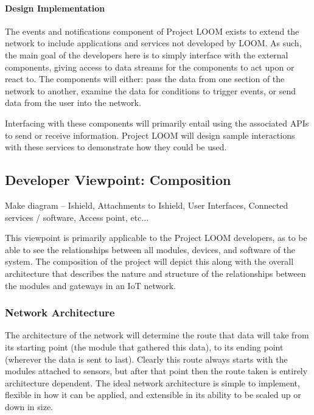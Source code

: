\documentclass[onecolumn, draftclsnofoot,10pt, compsoc]{IEEEtran}
\begin{document}
\paragraph{Design Implementation}
    The events and notifications component of Project LOOM exists to extend the network to include applications and services not developed by LOOM. As such, the main goal of the developers here is to simply interface with the external components, giving access to data streams for the components to act upon or react to. The components will either: pass the data from one section of the network to another, examine the data for conditions to trigger events, or send data from the user into the network.

    Interfacing with these components will primarily entail using the associated APIs to send or receive information. Project LOOM will design sample interactions with these services to demonstrate how they could be used.






\subsection{Developer Viewpoint: Composition}
    Make diagram – Ishield, Attachments to Ishield, User Interfaces, Connected services / software, Access point, etc...

    This viewpoint is primarily applicable to the Project LOOM developers, as to be able to see the relationships between all modules, devices, and software of the system. The composition of the project will depict this along with the overall architecture that describes the nature and structure of the relationships between the modules and gateways in an IoT network.

\subsubsection{Network Architecture}
    The architecture of the network will determine the route that data will take from its starting point (the module that gathered this data), to its ending point (wherever the data is sent to last). Clearly this route always starts with the modules attached to sensors, but after that point then the route taken is entirely architecture dependent. The ideal network architecture is simple to implement, flexible in how it can be applied, and extensible in its ability to be scaled up or down in size. 
\end{document}
